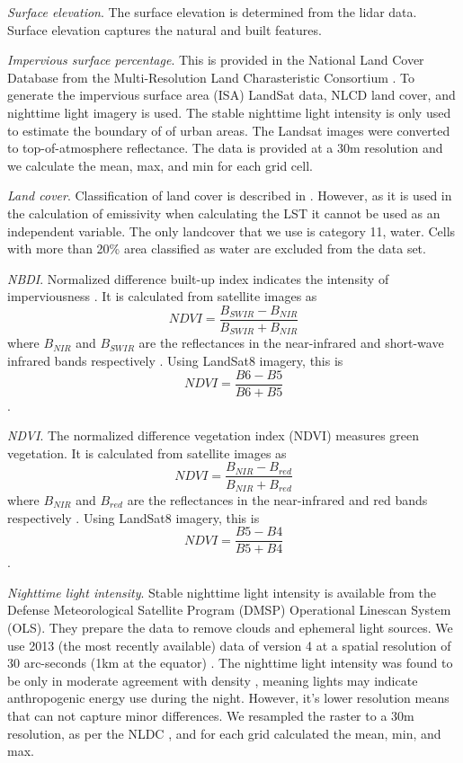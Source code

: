 \documentclass[final,3p,times,twocolumn,sort&compress]{elsarticle}
\begin{document}
\textit{Surface elevation}. The surface elevation is determined from the lidar data. Surface elevation captures the natural and built features. 

\textit{Impervious surface percentage}. This is provided in the National Land Cover Database from the Multi-Resolution Land Charasteristic Consortium \cite{Xian2011-aa}. To generate the impervious surface area (ISA) LandSat data, NLCD land cover, and nighttime light imagery is used. The stable nighttime light intensity is only used to estimate the boundary of of urban areas. The Landsat images were converted to top-of-atmosphere reflectance. The data is provided at a 30m resolution and we calculate the mean, max, and min for each grid cell.

\textit{Land cover}. Classification of land cover is described in \cite{Homer2015-ce}. However, as it is used in the calculation of emissivity when calculating the LST it cannot be used as an independent variable. The only landcover that we use is category 11, water. Cells with more than 20\% area classified as water are excluded from the data set.

\textit{NBDI}. Normalized difference built-up index indicates the intensity of imperviousness \cite{Bhatti2014-ae}. It is calculated from satellite images as $$NDVI=\frac{B_{SWIR}-B_{NIR}}{B_{SWIR}+B_{NIR}}$$ where $B_{NIR}$ and $B_{SWIR}$ are the reflectances in the near-infrared and short-wave infrared bands respectively \cite{Alhawiti2016-wv}. Using LandSat8 imagery, this is $$NDVI=\frac{B6-B5}{B6+B5}$$ \cite{barsi2014}.

\textit{NDVI}. The normalized difference vegetation index (NDVI) measures green vegetation. It is calculated from satellite images as $$NDVI=\frac{B_{NIR}-B_{red}}{B_{NIR}+B_{red}}$$ where $B_{NIR}$ and $B_{red}$ are the reflectances in the near-infrared and red bands respectively \cite{Alhawiti2016-wv}. Using LandSat8 imagery, this is $$NDVI=\frac{B5-B4}{B5+B4}$$ \cite{barsi2014}.

\textit{Nighttime light intensity}. Stable nighttime light intensity is available from the Defense Meteorological Satellite Program (DMSP) Operational Linescan System (OLS). They prepare the data to remove clouds and ephemeral light sources. We use 2013 (the most recently available) data of version 4 at a spatial resolution of 30 arc-seconds (1km at the equator) \cite{ngdc2013version}. The nighttime light intensity was found to be only in moderate agreement with density \cite{bagan2018}, meaning lights may indicate anthropogenic energy use during the night. However, it's lower resolution means that can not capture minor differences. We resampled the raster to a 30m resolution, as per the NLDC \cite{Homer2015-ce}, and for each grid calculated the mean, min, and max.
\end{document}
